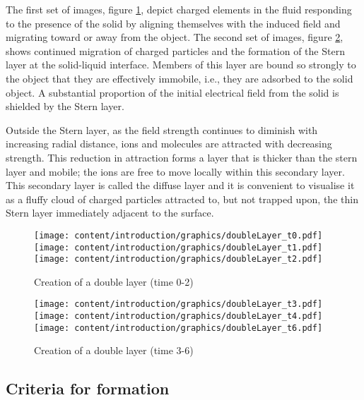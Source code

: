     The first set of images, figure \ref{fig:doubleLayer_set1}, depict charged elements in the fluid responding to the presence of the solid by aligning themselves with the induced field and migrating toward or away from the object. The second set of images, figure \ref{fig:doubleLayer_set2}, shows continued migration of charged particles and the formation of the Stern layer at the solid-liquid interface. Members of this layer are bound so strongly to the object that they are effectively immobile, i.e., they are adsorbed to the solid object. A substantial proportion of the initial electrical field from the solid is shielded by the Stern layer.

    Outside the Stern layer, as the field strength continues to diminish with increasing radial distance, ions and molecules are attracted with decreasing strength. This reduction in attraction forms a layer that is thicker than the stern layer and mobile; the ions are free to move locally within this secondary layer. This secondary layer is called the diffuse layer and it is convenient to visualise it as a fluffy cloud of charged particles attracted to, but not trapped upon, the thin Stern layer immediately adjacent to the surface.



   \begin{figure}
       \begin{center}
           \texttt{[image: content/introduction/graphics/doubleLayer\_t0.pdf]}
           \texttt{[image: content/introduction/graphics/doubleLayer\_t1.pdf]}
           \texttt{[image: content/introduction/graphics/doubleLayer\_t2.pdf]}
       \end{center}
       \caption{Creation of a double layer (time 0-2)}
       \label{fig:doubleLayer_set1}
   \end{figure}

   \begin{figure}
       \begin{center}
           \texttt{[image: content/introduction/graphics/doubleLayer\_t3.pdf]}
           \texttt{[image: content/introduction/graphics/doubleLayer\_t4.pdf]}
           \texttt{[image: content/introduction/graphics/doubleLayer\_t6.pdf]}
       \end{center}
       \caption{Creation of a double layer (time 3-6)}
       \label{fig:doubleLayer_set2}
   \end{figure}

\subsection{Criteria for formation}

